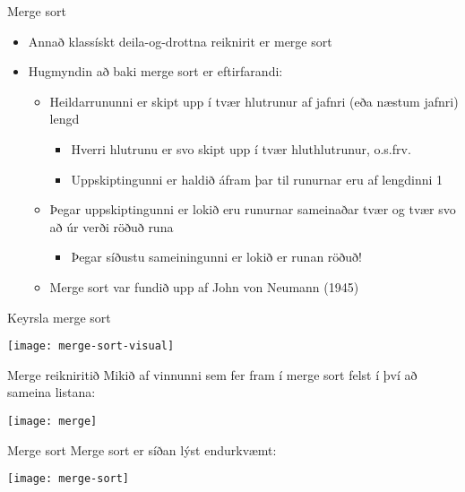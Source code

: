 \documentclass[handout]{beamer}
\begin{document}
\begin{frame}{Merge sort}
    \begin{itemize}
        \item Annað klassískt deila-og-drottna reiknirit er merge sort
        \item Hugmyndin að baki merge sort er eftirfarandi:
        \begin{itemize}
            \item Heildarrununni er skipt upp í tvær hlutrunur af jafnri (eða næstum jafnri) lengd
            \begin{itemize}
                \item Hverri hlutrunu er svo skipt upp í tvær hluthlutrunur, o.s.frv.
                \item Uppskiptingunni er haldið áfram þar til runurnar eru af lengdinni 1
            \end{itemize}
        \item Þegar uppskiptingunni er lokið eru runurnar sameinaðar tvær og tvær svo að úr verði röðuð runa
        \begin{itemize}
            \item Þegar síðustu sameiningunni er lokið er runan röðuð!
        \end{itemize}
        \item Merge sort var fundið upp af John von Neumann (1945)
        \end{itemize}
    \end{itemize}
\end{frame}

\begin{frame}{Keyrsla merge sort}
\vspace{0.5cm}
\begin{center}
\texttt{[image: merge-sort-visual]}
\end{center}
\end{frame}

\begin{frame}{Merge reikniritið}
Mikið af vinnunni sem fer fram í merge sort felst í því að sameina listana:
\begin{center}
\texttt{[image: merge]}
\end{center}
\end{frame}

\begin{frame}{Merge sort}
Merge sort er síðan lýst endurkvæmt:
\begin{center}
\texttt{[image: merge-sort]}
\end{center}
\end{frame}
\end{document}
